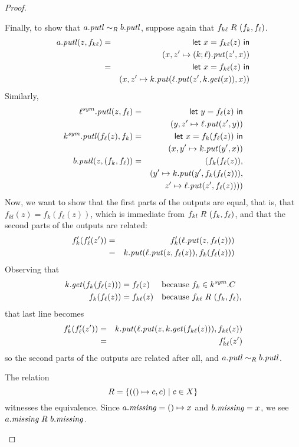 \begin{defn}[$R$-similarity]
\begin{theorem}
\begin{lemma}
\begin{theorem}[No products]
\begin{lemma}
\begin{defn}
\begin{theorem}
\begin{corollary}[Hylomorphism]
\begin{defn}
\begin{defn}[Symmetrization]
\begin{proof}
\begin{longenum}
Finally, to show that $a.\mathit{putl} \sim_R b.\mathit{putl}$, suppose again that
$f_{k\ell}\mathrel{R_{}}(f_k,f_\ell)$.
\begin{eqnarray*}
    a.\mathit{putl}(z,f_{k\ell})
    &=& \mathsf{let}\  x = f_{k\ell}(z) \ \mathsf{in} \\
    & & (x,z'\mapsto(k;\ell).\mathit{put}(z',x)) \\
    &=& \mathsf{let}\  x = f_{k\ell}(z) \ \mathsf{in} \\
    & & (x,z' \mapsto k.\mathit{put}(\ell.\mathit{put}(z',k.\mathit{get}(x)),x))
\end{eqnarray*}
Similarly,
\begin{eqnarray*}
    \ell^\mathit{sym}.\mathit{putl}(z,f_\ell)
    &=& \mathsf{let}\  y = f_\ell(z) \ \mathsf{in} \\
    & & (y,z' \mapsto \ell.\mathit{put}(z',y)) \\
    k^\mathit{sym}.\mathit{putl}(f_\ell(z),f_k)
    &=& \mathsf{let}\  x = f_k(f_\ell(z)) \ \mathsf{in} \\
    & & (x,y' \mapsto k.\mathit{put}(y',x)) \\
    b.\mathit{putl}(z,(f_k,f_\ell))
    &=& (f_k(f_\ell(z)), \\
    & & (y' \mapsto k.\mathit{put}(y',f_k(f_\ell(z))), \\
    & & z' \mapsto \ell.\mathit{put}(z',f_\ell(z))))
\end{eqnarray*}
Now, we want to show that the first parts of the outputs are equal, that is,
that $f_{kl}(z) = f_k(f_\ell(z))$, which is immediate from
$f_{kl}\mathrel{R_{}}(f_k,f_\ell)$, and that the second parts of the outputs are
related:
\begin{eqnarray*}
    f_k'(f_\ell'(z')) &=& f_k'(\ell.\mathit{put}(z,f_\ell(z))) \\
    &=& k.\mathit{put}(\ell.\mathit{put}(z,f_\ell(z)),f_k(f_\ell(z)))
\end{eqnarray*}
Observing that
\begin{align*}
    k.\mathit{get}(f_k(f_\ell(z))) &= f_\ell(z) && \mbox{because }f_k \in k^\mathit{sym}.C \\
    f_k(f_\ell(z)) &= f_{k\ell}(z) && \mbox{because }f_{k\ell} \mathrel{R_{}}(f_k,f_\ell),
\end{align*}
that last line becomes
\begin{eqnarray*}
    f_k'(f_\ell'(z'))
    &=& k.\mathit{put}(\ell.\mathit{put}(z,k.\mathit{get}(f_{k\ell}(z))),f_{k\ell}(z)) \\
    &=& f_{k\ell}'(z')
\end{eqnarray*}
so the second parts of the outputs are related after all, and $a.\mathit{putl}
\sim_R b.\mathit{putl}$.

\item The relation
\[R = \{({()} \mapsto c,c) \mid c \in X\}\]
witnesses the equivalence. Since $a.\mathit{missing} = {()} \mapsto x$ and
$b.\mathit{missing} = x$, we see $a.\mathit{missing} \mathrel{R_{}} b.\mathit{missing}$.


\end{longenum}
\end{proof}
\end{defn}
\end{defn}
\end{corollary}
\end{theorem}
\end{defn}
\end{lemma}
\end{theorem}
\end{lemma}
\end{theorem}
\end{defn}
